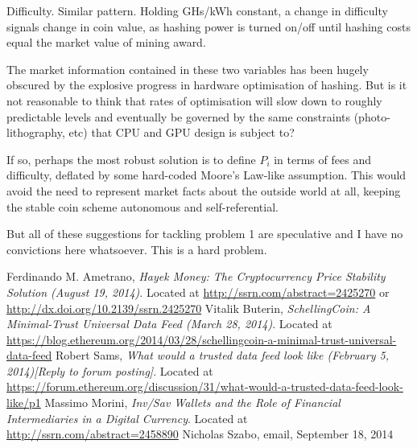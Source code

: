 \documentclass[twocolumn]{article}
\begin{document}
Difficulty. Similar pattern. Holding GHs/kWh constant, a change in
difficulty signals change in coin value, as hashing power is turned
on/off until hashing costs equal the market value of mining award. 

The market information contained in these two variables has been
hugely obscured by the explosive progress in hardware optimisation of
hashing. But is it not reasonable to think that rates of optimisation
will slow down to roughly predictable levels and eventually be
governed by the same constraints (photo-lithography, etc) that CPU and
GPU design is subject to? 

If so, perhaps the most robust solution is to define $P_{i}$ in terms
of fees and difficulty, deflated by some hard-coded Moore's Law-like
assumption. This would avoid the need to represent market facts about
the outside world at all, keeping the stable coin scheme autonomous
and self-referential. 

But all of these suggestions for tackling problem 1 are speculative
and I have no convictions here whatsoever. This is a hard problem.

\begin{thebibliography}{9}
Ferdinando M. Ametrano,
  \emph{Hayek Money: The Cryptocurrency Price Stability Solution
    (August 19, 2014)}.
Located at \url{http://ssrn.com/abstract=2425270} or
\url{http://dx.doi.org/10.2139/ssrn.2425270}
Vitalik Buterin, \emph{SchellingCoin: A Minimal-Trust Universal Data Feed (March 28,
  2014)}. Located at
\url{https://blog.ethereum.org/2014/03/28/schellingcoin-a-minimal-trust-universal-data-feed}
Robert Sams, \emph{What would a trusted data feed look like (February 5,
  2014)[Reply to forum posting]}. Located at
\url{https://forum.ethereum.org/discussion/31/what-would-a-trusted-data-feed-look-like/p1}
Massimo Morini, \emph{Inv/Sav Wallets and the Role of Financial Intermediaries in a Digital Currency}.
Located at \url{http://ssrn.com/abstract=2458890}
Nicholas Szabo, email, September 18, 2014
  \end{thebibliography}
\end{document}

